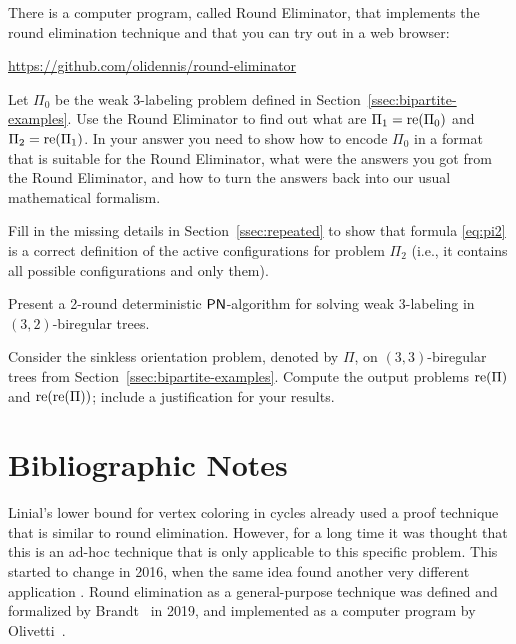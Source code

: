 \begin{ex}
	There is a computer program, called Round Eliminator, that implements the round elimination technique and that you can try out in a web browser:
	\begin{center}
		\url{https://github.com/olidennis/round-eliminator}
	\end{center}
	Let $\Pi_0$ be the weak 3-labeling problem defined in Section~\ref{ssec:bipartite-examples}. Use the Round Eliminator to find out what are $\Pi_1 = \operatorname{re}(\Pi_0)$ and $\Pi_2 = \operatorname{re}(\Pi_1)$. In your answer you need to show how to encode $\Pi_0$ in a format that is suitable for the Round Eliminator, what were the answers you got from the Round Eliminator, and how to turn the answers back into our usual mathematical formalism.
\end{ex}

\begin{ex}\label{ex:pi2}
	Fill in the missing details in Section~\ref{ssec:repeated} to show that formula \eqref{eq:pi2} is a correct definition of the active configurations for problem $\Pi_2$ (i.e., it contains all possible configurations and only them).
\end{ex}

\begin{ex}
	Present a 2-round deterministic $\textup{\sffamily PN}$-algorithm for solving weak 3-labeling in $(3,2)$-biregular trees.
\end{ex}

\begin{ex}
	Consider the sinkless orientation problem, denoted by $\Pi$, on $(3,3)$-biregular trees from Section~\ref{ssec:bipartite-examples}. Compute the output problems $\operatorname{re}(\Pi)$ and $\operatorname{re}(\operatorname{re}(\Pi))$; include a justification for your results.
\end{ex}

\section{Bibliographic Notes}

Linial's \cite{linial92locality} lower bound for vertex coloring in cycles already used a proof technique that is similar to round elimination. However, for a long time it was thought that this is an ad-hoc technique that is only applicable to this specific problem. This started to change in 2016, when the same idea found another very different application \cite{brandt16lll}. Round elimination as a general-purpose technique was defined and formalized by Brandt~\cite{Brandt2019automatic} in 2019, and implemented as a computer program by Olivetti~\cite{Olivetti2019}.
